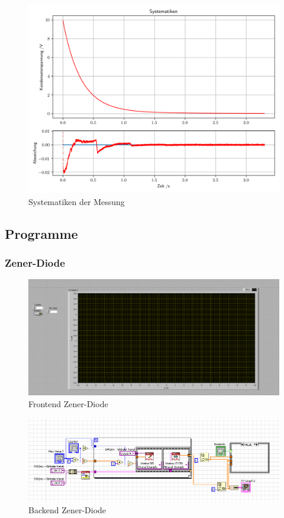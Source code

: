 \documentclass[12pt,twoside,a4paper]{scrartcl}
\begin{document}
			\begin{figure}[H]
				\centering
				\includegraphics[width = \textwidth]{Plots/Capacitor/CapacitorSystematiken}
				\caption{Systematiken der Messung}
			\end{figure}

\newpage
	\subsection{Programme}
		\subsubsection{Zener-Diode}
			\label{Programme::Z}
		\begin{figure}[H]
			\centering
			\includegraphics[width =  \textwidth]{Pictures/Programme/Frontend_Zener}
			\caption{Frontend Zener-Diode}
		\end{figure}

			\begin{figure}[H]
				\centering
				\includegraphics[width =  \textwidth]{Pictures/Programme/Backend_Zener}
				\caption{Backend Zener-Diode}
			\end{figure}
\end{document}
